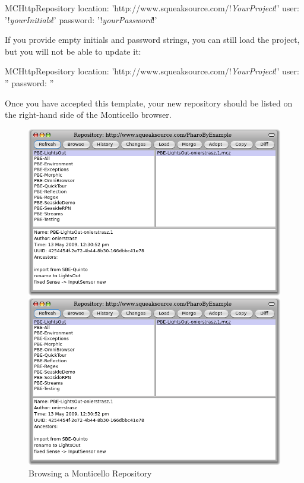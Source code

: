 \documentclass[a4paper,10pt,twoside]{book}
\begin{document}
{{
\begin{code}{}
MCHttpRepository 
    location: 'http://www.squeaksource.com/!\emph{YourProject}!'
    user: '!\emph{yourInitials}!' 
    password: '!\emph{yourPassword}!'
\end{code}   

\noindent
If you provide empty initials and password strings, you can still load the project, but you will not be able to update it:

\begin{code}{}
MCHttpRepository 
    location: 'http://www.squeaksource.com/!\emph{YourProject}!'
    user: '' 
    password: ''
\end{code}   

Once you have accepted this template, your new repository should be listed on the right-hand side of the Monticello browser.

\begin{figure}[hbt]
\ifluluelse
	{\centerline {\includegraphics[width=\textwidth]{BrowseRepository}}}
	{\centerline {\includegraphics[scale=0.7]{BrowseRepository}}}
\caption{Browsing a Monticello Repository
}
\end{figure}

}}
\end{document}
